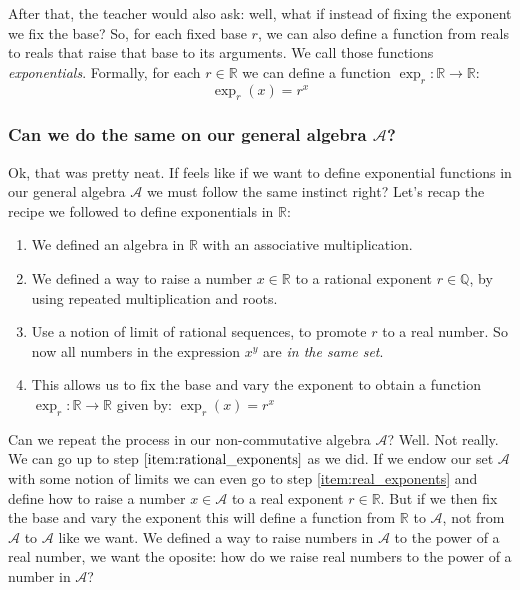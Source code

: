 After that, the teacher would also ask: well, what if instead of fixing the exponent we fix the base? So, for each fixed base $r$, we can also define a function from reals to reals that raise that base to its arguments. We call those functions \emph{exponentials}. Formally, for each $r \in \mathbb{R}$ we can define a function $\exp_r: \mathbb{R} \to \mathbb{R}$:
\begin{equation}
  \exp_r(x)  =  r^x
\end{equation}

\subsubsection{Can we do the same on our general algebra $\mathcal{A}$?}

Ok, that was pretty neat. If feels like if we want to define exponential functions in our general algebra $\mathcal{A}$ we must follow the same instinct right? Let's recap the recipe we followed to define exponentials in $\mathbb{R}$:
\begin{enumerate}
  \item We defined an algebra in $\mathbb{R}$ with an associative multiplication.
  \item \label{item:rational_exponents} We defined a way to raise a number $x \in \mathbb{R}$ to a rational exponent $r \in \mathbb{Q}$, by using repeated multiplication and roots.
  \item \label{item:real_exponents}Use a notion of limit of rational sequences, to promote $r$ to a real number. So now all numbers in the expression  $x^y$ are \emph{in the same set}.
  \item \label{item:fix_base}This allows us to fix the base and vary the exponent to obtain a function $\exp_r: \mathbb{R} \to \mathbb{R}$ given by: $\exp_r(x) = r^x$
\end{enumerate}

Can we repeat the process in our non-commutative algebra $\mathcal{A}$? Well. Not really. We can go up to step $\ref{item:rational_exponents}$ as we did. If we endow our set $\mathcal{A}$ with some notion of limits we can even go to step \ref{item:real_exponents} and define how to raise a number $x\in\mathcal{A}$ to a real exponent $r\in\mathbb{R}$. But if we then fix the base and vary the exponent this will define a function from $\mathbb{R}$ to $\mathcal{A}$, not from $\mathcal{A}$ to $\mathcal{A}$ like we want. We defined a way to raise numbers in $\mathcal{A}$ to the power of a real number, we want the oposite: how do we raise real numbers to the power of a number in $\mathcal{A}$?

